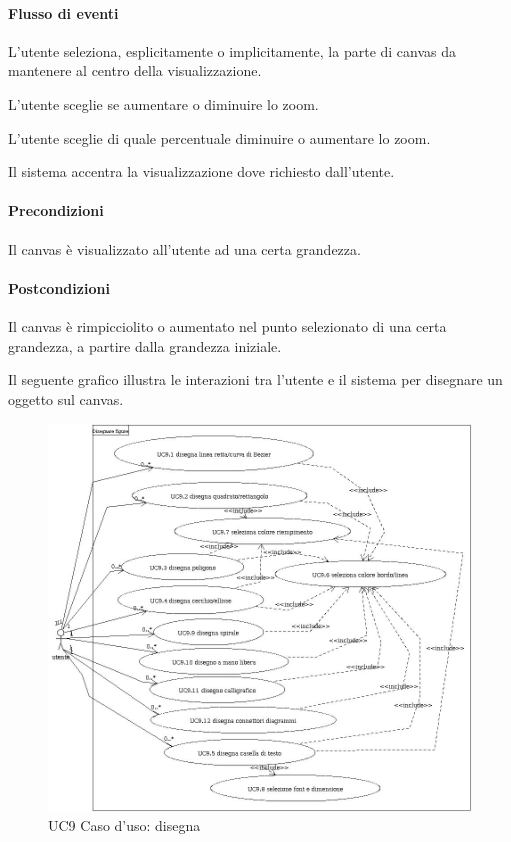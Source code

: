 \paragraph{Flusso di eventi}
\begin{elenconumerato}[\textbf{}]{\subsubsecindent}
\item L'utente seleziona, esplicitamente o implicitamente, la parte di canvas da mantenere al centro della visualizzazione.
\item L'utente sceglie se aumentare o diminuire lo zoom.
\item L'utente sceglie di quale percentuale diminuire o aumentare lo zoom.
\item Il sistema accentra la visualizzazione dove richiesto dall'utente.
\end{elenconumerato}
\paragraph{Precondizioni} Il canvas \`e visualizzato all'utente ad una certa grandezza.
\paragraph{Postcondizioni} Il canvas \`e rimpicciolito o aumentato nel punto selezionato di una certa grandezza, a partire dalla grandezza iniziale.
\newpage

\label{ucdisegna}
Il seguente grafico illustra le interazioni tra l'utente e il sistema per disegnare un oggetto sul canvas.

\begin{figure}[!ht]
\centering
\vspace{20pt} 
\includegraphics[width=17cm]{UC9Espanso.jpg}
\caption{UC9 Caso d'uso: disegna}
\label{uc9}
\end{figure}


